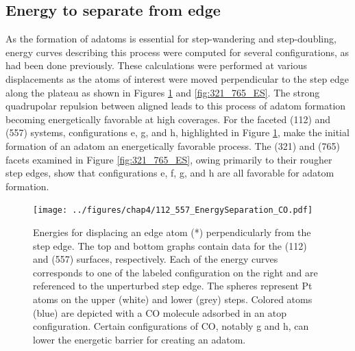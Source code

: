 \subsection{Energy to separate from edge}
As the formation of adatoms is essential for step-wandering and step-doubling,
energy curves describing this process were computed for several 
configurations, as had been done previously.  \citep{Michalka:2013aa,
Michalka:2015aa} These calculations were performed at various displacements as
the atoms of interest were moved perpendicular to the step edge along the
plateau as shown in Figures \ref{fig:112_557_ES} and \ref{fig:321_765_ES}. The
strong quadrupolar repulsion between aligned  leads to this process of
adatom formation becoming energetically favorable at high coverages. For the
faceted (112) and (557) systems, configurations e, g, and h, highlighted in
Figure \ref{fig:112_557_ES}, make the initial formation of an adatom an
energetically favorable process. The (321) and (765) facets examined in Figure
\ref{fig:321_765_ES}, owing primarily to their rougher step edges, show that
configurations e, f, g, and h are all favorable for adatom formation.

\begin{landscape}
\begin{figure}[p!]
  \centering
  \texttt{[image: ../figures/chap4/112\_557\_EnergySeparation\_CO.pdf]}
  \caption{Energies for displacing an edge atom (*) perpendicularly from the
step edge. The top and bottom graphs contain data for the (112) and (557)
surfaces, respectively.  Each of the energy curves corresponds to one of the
labeled configuration on the right and are referenced to the unperturbed step
edge. The spheres represent Pt atoms on the upper (white) and lower (grey)
steps.  Colored atoms (blue) are depicted with a CO molecule adsorbed in an
atop configuration. Certain configurations of CO, notably g and h, can lower
the energetic barrier for creating an adatom.}
\label{fig:112_557_ES}
\end{figure}
\end{landscape}

